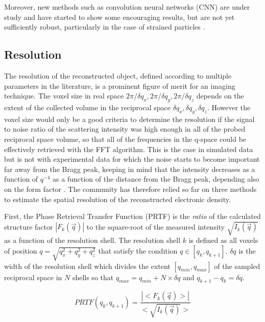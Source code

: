 Moreover, new methods such as convolution neural networks (CNN) are under study and have started to show some encouraging results, but are not yet sufficiently robust, particularly in the case of strained particles \parencite{cherukara_real-time_2018,chan_rapid_2021,Wu2021a}.

\subsection{Resolution}

The resolution of the reconstructed object, defined according to multiple parameters in the literature, is a prominent figure of merit for an imaging technique.
The voxel size in real space $2\pi / \delta q_x, 2\pi / \delta q_y, 2\pi / \delta q_z$ depends on the extent of the collected volume in the reciprocal space $\delta q_x, \delta q_y, \delta q_z$.
However the voxel size would only be a good criteria to determine the resolution if the signal to noise ratio of the scattering intensity was high enough in all of the probed reciprocal space volume, so that all of the frequencies in the q-space could be effectively retrieved with the FFT algorithm.
This is the case in simulated data but is not with experimental data for which the noise starts to become important far away from the Bragg peak, keeping in mind that the intensity decreases as a function of $q^{-4}$ \parencite{Marchesini2003a} as a function of the distance from the Bragg peak, depending also on the form factor \parencite{croset_form_2017}.
The community has therefore relied so far on three methods to estimate the spatial resolution of the reconstructed electronic density.

First, the Phase Retrieval Transfer Function (PRTF) \parencite{chapman_high-resolution_2006} is the \textit{ratio} of the calculated structure factor $|F_k(\vec{q})|$ to the square-root of the measured intensity $\sqrt{I_k(\vec{q})}$ as a function of the resolution shell.
The resolution shell $k$ is defined as all voxels of position $q=\sqrt{q_x^2 + q_y^2 +q_z^2}$ that satisfy the condition $q \in [q_k, q_{k+1}]$.
$\delta q$ is the width of the resolution shell which divides the extent $[q_{min}, q_{max}]$ of the sampled reciprocal space in $N$ shells so that $q_{max} = q_{min} + N \times \delta q$ and $q_{k+1} - q_{k} = \delta q$.

\begin{equation}
    PRTF(q_k, q_{k+1}) = \frac{|<F_k(\vec{q})>|}{<\sqrt{I_k(\vec{q})}>}
\end{equation}

